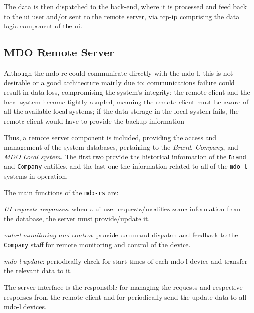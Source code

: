 The data is then dispatched to the back-end, where it is processed and feed back
to the \gls{ui} user and/or sent to the remote server, via \gls{tcp-ip}
comprising the data logic component of the \gls{ui}.
%
%
\subsection{MDO Remote Server}
\label{sec:mdo-remote-server}
Although the \gls{mdo-rc} could communicate directly with the \gls{mdo-l}, this
is not desirable or a good architecture mainly due to: communications failure could
result in data loss, compromising the system's integrity; the remote client and
the local system become tightly coupled, meaning the remote client must be aware
of all the available local systems; if the data storage in the local system
fails, the remote client would have to provide the backup information.

Thus, a remote server component is included, providing the access and management
of the system databases, pertaining to the \emph{Brand}, \emph{Company}, and
\emph{MDO Local system}. The first two provide the historical information of the
\texttt{Brand} and \texttt{Company} entities, and the last one the information
related to all of the \texttt{\gls{mdo-l}} systems in operation.

The main functions of the \texttt{\gls{mdo-rs}} are:
\begin{item-c}
\item \emph{UI requests responses}: when a \gls{ui} user requests/modifies
  some information from the database, the server must provide/update it.
\item \emph{\gls{mdo-l} monitoring and control}: provide command dispatch and
  feedback to the \texttt{Company} staff for remote monitoring and control of
  the device.
\item \emph{\gls{mdo-l} update}: periodically check for start times of each
  \gls{mdo-l} device and transfer the relevant data to it.
\end{item-c}

The server interface is the responsible for managing the requests and respective
responses from the remote client and for periodically send the update data to
all \gls{mdo-l} devices. 
%
%
